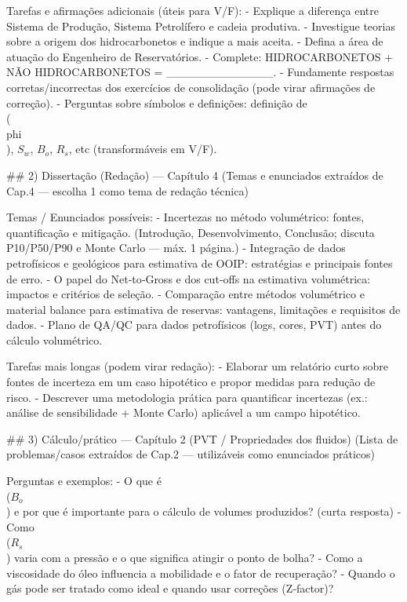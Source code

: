 \documentclass[11pt,a4paper]{article}
\begin{document}
\begin{enumerate}
{Tarefas e afirmações adicionais (úteis para V/F):
- Explique a diferença entre Sistema de Produção, Sistema Petrolífero e cadeia produtiva.
- Investigue teorias sobre a origem dos hidrocarbonetos e indique a mais aceita.
- Defina a área de atuação do Engenheiro de Reservatórios.
- Complete: HIDROCARBONETOS + NÃO HIDROCARBONETOS = _____________.
- Fundamente respostas corretas/incorrectas dos exercícios de consolidação (pode virar afirmações de correção).
- Perguntas sobre símbolos e definições: definição de \\(\\phi\\), $S_{w}$, $B_{o}$, $R_{s}$, etc (transformáveis em V/F).


## 2) Dissertação (Redação) — Capítulo 4
(Temas e enunciados extraídos de Cap.4 — escolha 1 como tema de redação técnica)

Temas / Enunciados possíveis:
- Incertezas no método volumétrico: fontes, quantificação e mitigação. (Introdução, Desenvolvimento, Conclusão; discuta P10/P50/P90 e Monte Carlo — máx. 1 página.)
- Integração de dados petrofísicos e geológicos para estimativa de OOIP: estratégias e principais fontes de erro.
- O papel do Net‑to‑Gross e dos cut‑offs na estimativa volumétrica: impactos e critérios de seleção.
- Comparação entre métodos volumétrico e material balance para estimativa de reservas: vantagens, limitações e requisitos de dados.
- Plano de QA/QC para dados petrofísicos (logs, cores, PVT) antes do cálculo volumétrico.

Tarefas mais longas (podem virar redação):
- Elaborar um relatório curto sobre fontes de incerteza em um caso hipotético e propor medidas para redução de risco.
- Descrever uma metodologia prática para quantificar incertezas (ex.: análise de sensibilidade + Monte Carlo) aplicável a um campo hipotético.


## 3) Cálculo/prático — Capítulo 2 (PVT / Propriedades dos fluidos)
(Lista de problemas/casos extraídos de Cap.2 — utilizáveis como enunciados práticos)

Perguntas e exemplos:
- O que é \\($B_{o}$\\) e por que é importante para o cálculo de volumes produzidos? (curta resposta)  
- Como \\($R_{s}$\\) varia com a pressão e o que significa atingir o ponto de bolha?  
- Como a viscosidade do óleo influencia a mobilidade e o fator de recuperação?  
- Quando o gás pode ser tratado como ideal e quando usar correções (Z‑factor)?

}
\end{enumerate}
\end{document}
